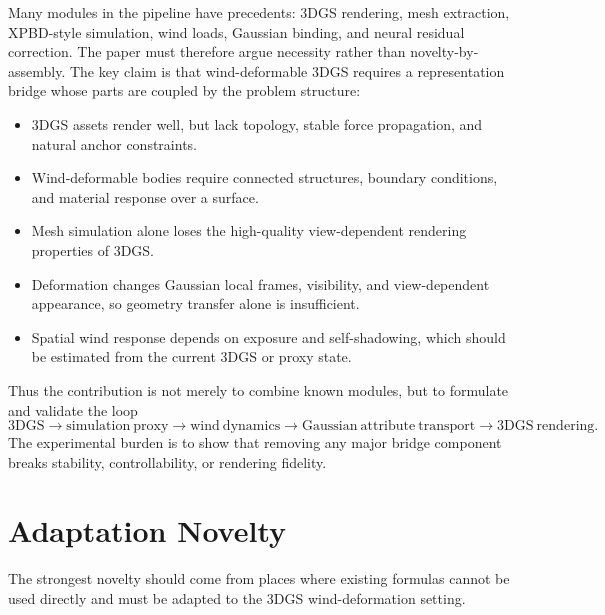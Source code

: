 \documentclass[11pt]{article}
\begin{document}
Many modules in the pipeline have precedents: 3DGS rendering, mesh extraction, XPBD-style simulation, wind loads, Gaussian binding, and neural residual correction. The paper must therefore argue necessity rather than novelty-by-assembly. The key claim is that wind-deformable 3DGS requires a representation bridge whose parts are coupled by the problem structure:

\begin{itemize}
  \item 3DGS assets render well, but lack topology, stable force propagation, and natural anchor constraints.
  \item Wind-deformable bodies require connected structures, boundary conditions, and material response over a surface.
  \item Mesh simulation alone loses the high-quality view-dependent rendering properties of 3DGS.
  \item Deformation changes Gaussian local frames, visibility, and view-dependent appearance, so geometry transfer alone is insufficient.
  \item Spatial wind response depends on exposure and self-shadowing, which should be estimated from the current 3DGS or proxy state.
\end{itemize}

Thus the contribution is not merely to combine known modules, but to formulate and validate the loop
\[
  \mathrm{3DGS}
  \rightarrow
  \mathrm{simulation\ proxy}
  \rightarrow
  \mathrm{wind\ dynamics}
  \rightarrow
  \mathrm{Gaussian\ attribute\ transport}
  \rightarrow
  \mathrm{3DGS\ rendering}.
\]
The experimental burden is to show that removing any major bridge component breaks stability, controllability, or rendering fidelity.

\section{Adaptation Novelty}

The strongest novelty should come from places where existing formulas cannot be used directly and must be adapted to the 3DGS wind-deformation setting.
\end{document}

